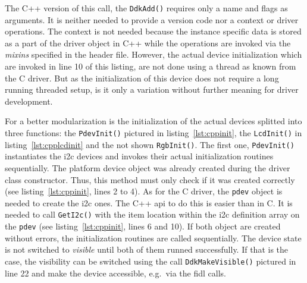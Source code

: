 %
The C++ version of this call, the \texttt{DdkAdd()} requires only a name and flags as arguments.
It is neither needed to provide a version code nor a context or driver operations.
The context is not needed because the instance specific data is stored as a part of the driver object in C++ while the operations are invoked via the \textit{mixins} specified in the header file.
However, the actual device initialization which are invoked in line 10 of this listing, are not done using a thread as known from the C driver.
But as the initialization of this device does not require a long running threaded setup, is it only a variation without further meaning for driver development.

For a better modularization is the initialization of the actual devices splitted into three functions: the \texttt{PdevInit()} pictured in listing~\ref{lst:cppinit}, the \texttt{LcdInit()} in listing~\ref{lst:cpplcdinit} and the not shown \texttt{RgbInit()}.
The first one, \texttt{PdevInit()} instantiates the \ac{i2c} devices and invokes their actual initialization routines sequentially.
The platform device object was already created during the driver class constructor.
Thus, this method must only check if it was created correctly (see listing~\ref{lst:cppinit}, lines 2 to 4).
As for the C driver, the \texttt{pdev} object is needed to create the \ac{i2c} ones.
The C++ \ac{api} to do this is easier than in C.
It is needed to call \texttt{GetI2c()} with the item location within the \ac{i2c} definition array on the \texttt{pdev} (see listing~\ref{lst:cppinit}, lines 6 and 10).
If both object are created without errors, the initialization routines are called sequentially.
The device state is not switched to \textit{visible} until both of them runned successfully.
If that is the case, the visibility can be switched using the call \texttt{DdkMakeVisible()} pictured in line 22 and make the device accessible, e.g.\ via the \ac{fidl} calls.


